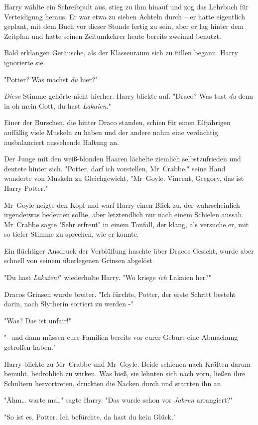 {Harry wählte ein Schreibpult aus, stieg zu ihm hinauf und zog das Lehrbuch für Verteidigung heraus. Er war etwa zu sieben Achteln durch -- er hatte eigentlich geplant, mit dem Buch vor dieser Stunde fertig zu sein, aber er lag hinter dem Zeitplan und hatte seinen Zeitumkehrer heute bereits zweimal benutzt.

Bald erklangen Geräusche, als der Klassenraum sich zu füllen begann. Harry ignorierte sie.

"Potter? Was machst \emph{du} hier?"

\emph{Diese} Stimme gehörte nicht hierher. Harry blickte auf. "Draco? Was tust \emph{du} denn in oh mein Gott, du hast \emph{Lakaien.}"

Einer der Burschen, die hinter Draco standen, schien für einen Elfjährigen auffällig viele Muskeln zu haben und der andere nahm eine verdächtig ausbalanciert aussehende Haltung an.

Der Junge mit den weiß-blonden Haaren lächelte ziemlich selbstzufrieden und deutete hinter sich. "Potter, darf ich vorstellen, Mr~Crabbe," seine Hand wanderte von Muskeln zu Gleichgewicht, "Mr~Goyle. Vincent, Gregory, das ist Harry Potter."

Mr~Goyle neigte den Kopf und warf Harry einen Blick zu, der wahrscheinlich irgendetwas bedeuten sollte, aber letztendlich nur nach einem Schielen aussah. Mr~Crabbe sagte "Sehr erfreut" in einem Tonfall, der klang, als versuche er, mit so tiefer Stimme zu sprechen, wie er konnte.

Ein flüchtiger Ausdruck der Verblüffung huschte über Dracos Gesicht, wurde aber schnell von seinem überlegenen Grinsen abgelöst.

"Du hast \emph{Lakaien!}" wiederholte Harry. "Wo kriege \emph{ich} Lakaien her?"

Dracos Grinsen wurde breiter. "Ich fürchte, Potter, der erste Schritt besteht darin, nach Slytherin sortiert zu werden -"

"Was? Das ist unfair!"

"- und dann müssen eure Familien bereits vor eurer Geburt eine Abmachung getroffen haben."

Harry blickte zu Mr~Crabbe und Mr~Goyle. Beide schienen nach Kräften darum bemüht, bedrohlich zu wirken. Was hieß, sie lehnten sich nach vorn, ließen ihre Schultern hervortreten, drückten die Nacken durch und starrten ihn an.

"Ähm… warte mal," sagte Harry. "Das wurde schon vor \emph{Jahren} arrangiert?"

"So ist es, Potter. Ich befürchte, da hast du kein Glück."

}
